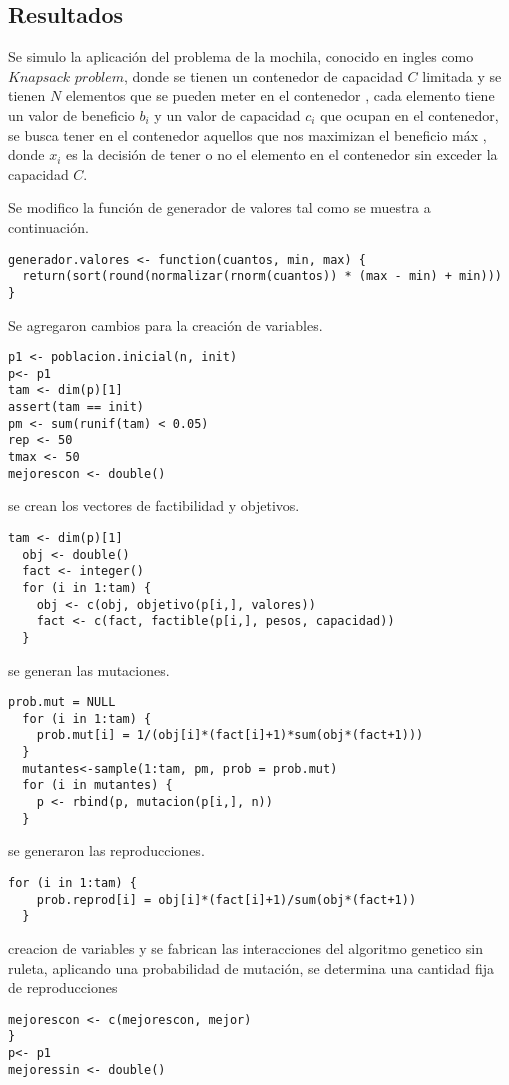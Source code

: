 \documentclass[10pt,a4paper]{article}
\begin{document}
\begin{multicols}{2}
	\section{Resultados}
    Se simulo la aplicación del problema de la mochila, conocido en ingles como $Knapsack$ $problem$, donde se tienen un contenedor de capacidad $C$ limitada y se tienen $N$ elementos que se pueden meter en el contenedor , cada elemento tiene un valor de beneficio $b_i$ y un valor de capacidad $c_i$ que ocupan en el contenedor, se busca tener en el contenedor aquellos que nos maximizan el beneficio máx , donde $x_i$ es la decisión de tener o no el elemento en el contenedor sin exceder la capacidad $C$.

Se modifico la función de generador de valores tal como se muestra a continuación. 
\begin{lstlisting}
generador.valores <- function(cuantos, min, max) {
  return(sort(round(normalizar(rnorm(cuantos)) * (max - min) + min)))
}
\end{lstlisting}
Se agregaron cambios para la creación de variables.
\begin{lstlisting}
p1 <- poblacion.inicial(n, init)
p<- p1
tam <- dim(p)[1]
assert(tam == init)
pm <- sum(runif(tam) < 0.05)
rep <- 50
tmax <- 50
mejorescon <- double()
\end{lstlisting}
se crean los vectores de factibilidad y objetivos.
\begin{lstlisting}
tam <- dim(p)[1]
  obj <- double()
  fact <- integer()
  for (i in 1:tam) {
    obj <- c(obj, objetivo(p[i,], valores))
    fact <- c(fact, factible(p[i,], pesos, capacidad))
  }
\end{lstlisting}
se generan las mutaciones.
\begin{lstlisting} 
prob.mut = NULL
  for (i in 1:tam) {
    prob.mut[i] = 1/(obj[i]*(fact[i]+1)*sum(obj*(fact+1)))
  }
  mutantes<-sample(1:tam, pm, prob = prob.mut)
  for (i in mutantes) {
    p <- rbind(p, mutacion(p[i,], n)) 
  }
\end{lstlisting}
se generaron las reproducciones.
\begin{lstlisting} 
for (i in 1:tam) {
    prob.reprod[i] = obj[i]*(fact[i]+1)/sum(obj*(fact+1))
  }
 \end{lstlisting}
creacion de variables y se fabrican las interacciones del algoritmo genetico sin ruleta, aplicando una probabilidad de mutación, se determina una cantidad fija de reproducciones
\begin{lstlisting}
mejorescon <- c(mejorescon, mejor)
}
p<- p1
mejoressin <- double()

\end{lstlisting}
\end{multicols}
\end{document}
